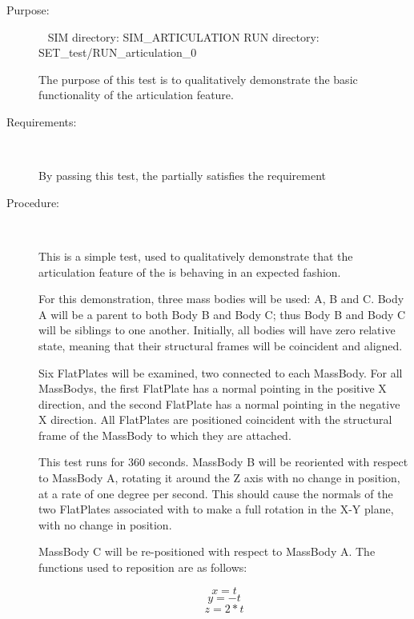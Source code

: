 \label{test:art_test_0}

\begin{description}

\item[Purpose:] \ \newline
SIM directory: SIM\_ARTICULATION
RUN directory: SET\_test/RUN\_articulation\_0

The purpose of this test is to qualitatively demonstrate the
basic functionality of the articulation feature.

\item[Requirements:] \ \newline

By passing this test, the \ModelDesc partially satisfies
the requirement 

\item[Procedure:] \ \newline

This is a simple test, used to qualitatively demonstrate that
the articulation feature of the \ModelDesc is behaving
in an expected fashion.

For this demonstration, three mass bodies will be used: A, B and C.
Body A will be a parent to both Body B and Body C; thus
Body B and Body C will be siblings to one another. Initially,
all bodies will have zero relative state, meaning that their
structural frames will be coincident and aligned.

Six FlatPlates will be examined, two connected to each MassBody.
For all MassBodys, the first FlatPlate has a normal pointing in
the positive X direction, and the second FlatPlate has a normal
pointing in the negative X direction. All FlatPlates are positioned
coincident with the structural frame of the MassBody to which
they are attached.

This test runs for 360 seconds. MassBody B will be reoriented with respect to
MassBody A, rotating it around the Z axis with no change in position, at a rate of
one degree per second. This should cause the
normals of the two FlatPlates associated with to make a full rotation in the X-Y plane, with
no change in position.

MassBody C will be re-positioned with respect to MassBody A. The
functions used to reposition are as follows:

\begin{equation}\label{position_equation_1}
x = t
\end{equation}
\begin{equation}\label{position_equation_2}
y = -t
\end{equation}
\begin{equation}\label{position_equation_3}
z = 2 * t
\end{equation}


\end{description}
